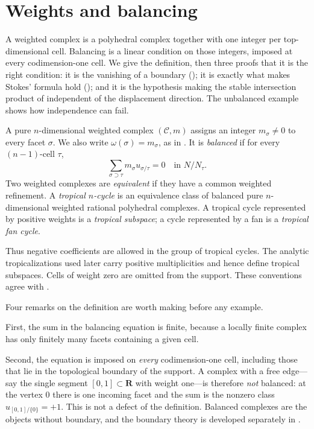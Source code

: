 \section{Weights and balancing}
\label{sec:ch10-balancing}

A weighted complex is a polyhedral complex together with one integer per
top-dimensional cell.  Balancing is a linear condition on those integers,
imposed at every codimension-one cell.  We give the definition, then three
proofs that it is the right condition: it is the vanishing of a boundary
(); it is exactly what makes Stokes'
formula hold (); and it is the hypothesis
making the stable intersection product of
 independent of the displacement
direction. The unbalanced example shows how independence can fail.

\begin{definition}
\label{def:ch10-weighted-balanced}
A pure $n$-dimensional weighted complex $(\mathscr C,m)$ assigns an integer
$m_\sigma\neq0$ to every facet $\sigma$.  We also write
$\omega(\sigma)=m_\sigma$, as in \cite[\S4.2]{MR18Tropical}. It is
\emph{balanced} if for every
$(n-1)$-cell $\tau$,
\[
                  \sum_{\sigma\supset\tau}
                    m_\sigma u_{\sigma/\tau}=0
                    \quad\text{in }N/N_\tau.
\]
Two weighted complexes are \emph{equivalent} if they have a common weighted
refinement.  A \emph{tropical $n$-cycle} is an equivalence class of balanced
pure $n$-dimensional weighted rational polyhedral complexes.  A tropical
cycle represented by positive weights is a \emph{tropical subspace}; a cycle
represented by a fan is a \emph{tropical fan cycle}.
\end{definition}

Thus negative coefficients are allowed in the group of tropical cycles.
The analytic tropicalizations used later carry positive multiplicities and
hence define tropical subspaces.  Cells of weight zero are omitted from the
support.  These conventions agree with
\cite[Definitions~4.2.1--4.2.3]{MR18Tropical}.

Four remarks on the definition are worth making before any example.

First, the sum in the balancing equation is finite, because a locally finite
complex has only finitely many facets containing a given cell.

Second, the equation is imposed on \emph{every} codimension-one cell, including
those that lie in the topological boundary of the support.  A complex with a
free edge---say the single segment $[0,1]\subset\mathbf R$ with weight
one---is therefore \emph{not} balanced: at the vertex $0$ there is one
incoming facet and the sum is the nonzero class $u_{[0,1]/\{0\}}=+1$.  This
is not a defect of the definition.  Balanced complexes are the objects
without boundary, and the boundary theory is developed separately in
.

